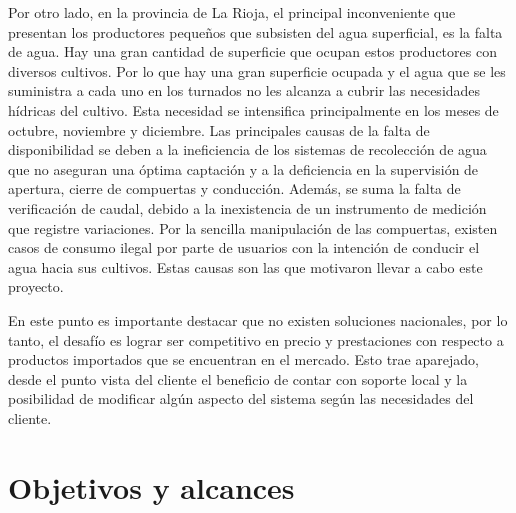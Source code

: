 Por otro lado, en la provincia de La Rioja, el principal inconveniente que presentan los productores pequeños que subsisten del agua superficial, es la falta de agua. Hay una gran cantidad de superficie que ocupan estos productores con diversos cultivos. Por lo que hay una gran superficie ocupada y el agua que se les suministra a cada uno en los turnados no les alcanza a cubrir las necesidades hídricas del cultivo. Esta necesidad se intensifica principalmente en los meses de octubre, noviembre y diciembre.
Las principales causas de la falta de disponibilidad se deben a la ineficiencia de los sistemas de recolección de agua que no aseguran una óptima captación y a la deficiencia en la supervisión de apertura, cierre de compuertas y conducción. Además, se suma la falta de verificación de caudal, debido a la inexistencia de un instrumento de medición que registre variaciones.
Por la sencilla manipulación de las compuertas, existen casos de consumo ilegal por parte de usuarios con la intención de conducir el agua hacia sus cultivos. Estas causas son las que motivaron llevar a cabo este proyecto.

En este punto es importante destacar que no existen soluciones nacionales, por lo tanto,  el desafío es lograr ser competitivo en precio y prestaciones con respecto a productos importados que se encuentran en el mercado. Esto trae aparejado, desde el punto vista del cliente el beneficio de contar con soporte local y la posibilidad de modificar algún aspecto del sistema según las necesidades del cliente.

\vspace{2cm}
\section{Objetivos y alcances}


